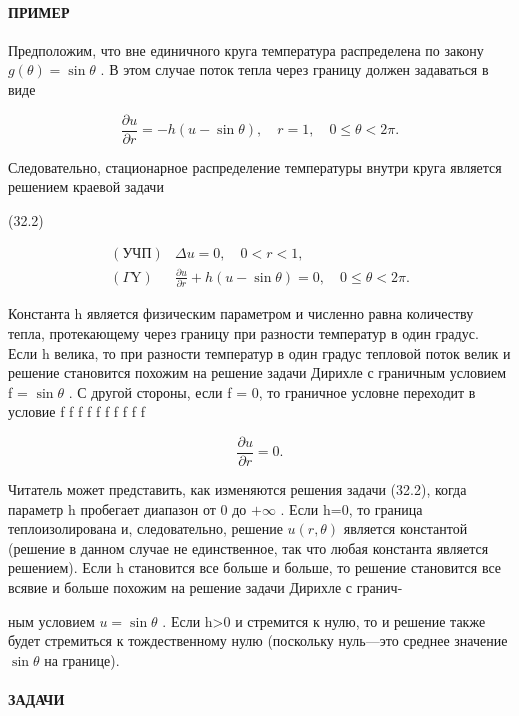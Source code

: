 \documentclass[
  ukrainian,
]{article}
\begin{document}
\paragraph{ПРИМЕР}\label{ux43fux440ux438ux43cux435ux440}

Предположим, что вне единичного круга температура распределена по закону
\(g(\theta) = \sin \theta\) . В этом случае поток тепла через границу
должен задаваться в виде

\[
\frac{\partial u}{\partial r} = -h(u - \sin \theta), \quad r = 1, \quad 0 \le \theta < 2\pi.
\]

Следовательно, стационарное распределение температуры внутри круга
является решением краевой задачи

(32.2)

\[
\begin{array}{lll} (\text{УЧП}) & \Delta u = 0, \quad 0 < r < 1, \\ (\Gamma \text{Y}) & \frac{\partial u}{\partial r} + h \left( u - \sin \theta \right) = 0, \quad 0 \leqslant \theta < 2\pi. \end{array}
\]

Константа h является физическим параметром и численно равна количеству
тепла, протекающему через границу при разности температур в один градус.
Если h велика, то при разности температур в один градус тепловой поток
велик и решение становится похожим на решение задачи Дирихле с граничным
условием f = \(\sin \theta\) . С другой стороны, если f = 0, то
граничное условне переходит в условие f f f f f f f f f f

\[
\frac{\partial u}{\partial r} = 0.
\]

Читатель может представить, как изменяются решения задачи (32.2), когда
параметр h пробегает диапазон от 0 до \(+\infty\) . Если h=0, то граница
теплоизолирована и, следовательно, решение \(u(r,\theta)\) является
константой (решение в данном случае не единственное, так что любая
константа является решением). Если h становится все больше и больше, то
решение становится все всявие и больше похожим на решение задачи Дирихле
с гранич-

ным условием \(u=\sin\theta\) . Если h\textgreater0 и стремится к нулю,
то и решение также будет стремиться к тождественному нулю (поскольку
нуль---это среднее значение \(\sin\theta\) на границе).

\paragraph{ЗАДАЧИ}\label{ux437ux430ux434ux430ux447ux438-7}
\end{document}
